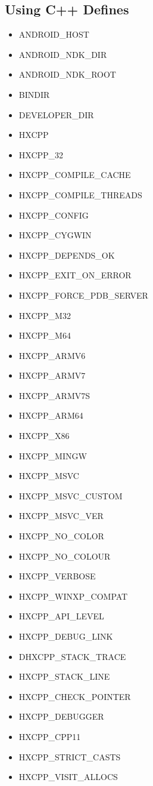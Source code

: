 \subsection{Using C++ Defines}
\label{target-cpp-defines}
\begin{itemize}
	\item ANDROID_HOST
	\item ANDROID_NDK_DIR
	\item ANDROID_NDK_ROOT
	\item BINDIR
	\item DEVELOPER_DIR
	\item HXCPP
	\item HXCPP_32
	\item HXCPP_COMPILE_CACHE
	\item HXCPP_COMPILE_THREADS
	\item HXCPP_CONFIG
	\item HXCPP_CYGWIN
	\item HXCPP_DEPENDS_OK
	\item HXCPP_EXIT_ON_ERROR
	\item HXCPP_FORCE_PDB_SERVER
	\item HXCPP_M32
	\item HXCPP_M64
	\item HXCPP_ARMV6
	\item HXCPP_ARMV7
	\item HXCPP_ARMV7S
	\item HXCPP_ARM64
	\item HXCPP_X86
	\item HXCPP_MINGW
	\item HXCPP_MSVC
	\item HXCPP_MSVC_CUSTOM
	\item HXCPP_MSVC_VER
	\item HXCPP_NO_COLOR
	\item HXCPP_NO_COLOUR
	\item HXCPP_VERBOSE
	\item HXCPP_WINXP_COMPAT
	\item HXCPP_API_LEVEL
	\item HXCPP_DEBUG_LINK
	\item DHXCPP_STACK_TRACE
	\item HXCPP_STACK_LINE
	\item HXCPP_CHECK_POINTER
	\item HXCPP_DEBUGGER
	\item HXCPP_CPP11
	\item HXCPP_STRICT_CASTS
	\item HXCPP_VISIT_ALLOCS

\end{itemize}
